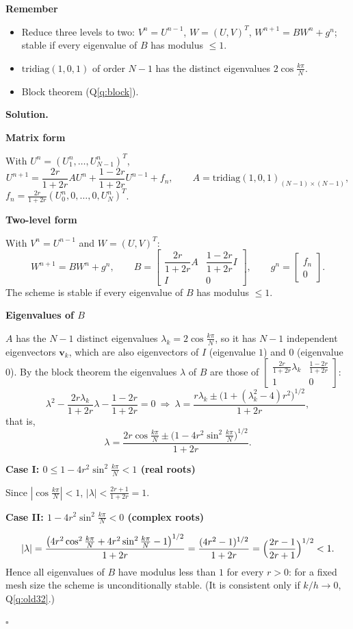 \documentclass[11pt,a4paper]{article}
\newenvironment{rem}
  {\begin{remember}\noindent\textbf{Remember}\par\nobreak\vspace{-0.3em}}
  {\end{remember}}
\newenvironment{solution}
  {\par\noindent\textbf{Solution.}\par\nobreak}
  {\par\nobreak\noindent\hfill\(\square\)\par}
\newcommand{\step}[1]{\par\addvspace{0.5em}\noindent\textbf{#1}\par\nobreak}
\begin{document}
\begin{rem}
\begin{itemize}
  \item Reduce three levels to two: \(V^n=U^{n-1}\), \(W=(U,V)^T\),
    \(W^{n+1}=BW^n+g^n\); stable if every eigenvalue of \(B\) has
    modulus \(\le1\).
  \item \(\mathrm{tridiag}(1,0,1)\) of order \(N-1\) has the distinct
    eigenvalues \(2\cos\frac{k\pi}N\).
  \item Block theorem (Q\ref{q:block}).
\end{itemize}
\end{rem}

\begin{solution}
\step{Matrix form}
With \(U^n=(U_1^n,\dots,U_{N-1}^n)^T\),
\[
  U^{n+1}=\frac{2r}{1+2r}AU^n+\frac{1-2r}{1+2r}U^{n-1}+f_n,
  \qquad A=\mathrm{tridiag}(1,0,1)_{(N-1)\times(N-1)},
\]
\(f_n=\frac{2r}{1+2r}(U_0^n,0,\dots,0,U_N^n)^T\).

\step{Two-level form}
With \(V^n=U^{n-1}\) and \(W=(U,V)^T\):
\[
  W^{n+1}=BW^n+g^n,\qquad
  B=\begin{bmatrix}\dfrac{2r}{1+2r}A&\dfrac{1-2r}{1+2r}I\\[6pt] I&0\end{bmatrix},
  \qquad g^n=\begin{bmatrix}f_n\\0\end{bmatrix}.
\]
The scheme is stable if every eigenvalue of \(B\) has modulus \(\le1\).

\step{Eigenvalues of \(B\)}
\(A\) has the \(N-1\) distinct eigenvalues
\(\lambda_k=2\cos\frac{k\pi}N\), so it has \(N-1\) independent
eigenvectors \(\mathbf v_k\), which are also eigenvectors of \(I\)
(eigenvalue \(1\)) and \(0\) (eigenvalue \(0\)).  By the block theorem
the eigenvalues \(\lambda\) of \(B\) are those of
\(\begin{bmatrix}\frac{2r}{1+2r}\lambda_k&\frac{1-2r}{1+2r}\\1&0\end{bmatrix}\):
\[
  \lambda^2-\frac{2r\lambda_k}{1+2r}\lambda-\frac{1-2r}{1+2r}=0
  \ \Longrightarrow\
  \lambda=\frac{r\lambda_k\pm\bigl(1+(\lambda_k^2-4)r^2\bigr)^{1/2}}{1+2r},
\]
that is,
\[
  \lambda=\frac{2r\cos\frac{k\pi}N\pm\bigl(1-4r^2\sin^2\frac{k\pi}N\bigr)^{1/2}}{1+2r}.
\]

\step{Case I: \(0\le1-4r^2\sin^2\frac{k\pi}N<1\) (real roots)}
Since \(|\cos\frac{k\pi}N|<1\),
\(|\lambda|<\frac{2r+1}{1+2r}=1\).

\step{Case II: \(1-4r^2\sin^2\frac{k\pi}N<0\) (complex roots)}
\[
  |\lambda|=\frac{\bigl(4r^2\cos^2\frac{k\pi}N+4r^2\sin^2\frac{k\pi}N-1\bigr)^{1/2}}{1+2r}
  =\frac{(4r^2-1)^{1/2}}{1+2r}=\Bigl(\frac{2r-1}{2r+1}\Bigr)^{1/2}<1 .
\]
Hence all eigenvalues of \(B\) have modulus less than \(1\) for every
\(r>0\): for a fixed mesh size the scheme is unconditionally stable.
(It is consistent only if \(k/h\to0\), Q\ref{q:old32}.)
\end{solution}
\end{document}
